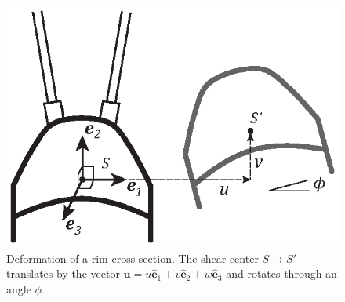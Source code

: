 \documentclass{bmd2016p}
\newcommand{\e}{\ensuremath{\hat{\bm{e}}_1}}
\newcommand{\ee}{\ensuremath{\hat{\bm{e}}_2}}
\newcommand{\eee}{\ensuremath{\hat{\bm{e}}_3}}
\begin{document}
\begin{figure}[!ht]
\centering
\includegraphics[scale=1.0]{figures/bmd_figures-06.eps}
\caption{Deformation of a rim cross-section. The shear center $S\rightarrow S'$ translates by the vector $\bm{u} = u\e + v\ee + w\eee$ and rotates through an angle $\phi$.}
\label{fig:def}
\end{figure}
\end{document}
